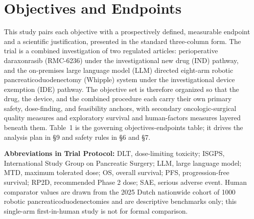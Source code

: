 \section{Objectives and Endpoints}

This study pairs each objective with a prospectively defined, measurable endpoint
and a scientific justification, presented in the standard three-column form. The
trial is a combined investigation of two regulated articles: perioperative
daraxonrasib (RMC-6236) under the investigational new drug (IND) pathway, and the
on-premises large language model (LLM) directed eight-arm robotic
pancreaticoduodenectomy (Whipple) system under the investigational device
exemption (IDE) pathway. The objective set is therefore organized so that the
drug, the device, and the combined procedure each carry their own primary
safety, dose-finding, and feasibility anchors, with secondary oncologic-surgical
quality measures and exploratory survival and human-factors measures layered
beneath them. Table~1 is the governing objectives-endpoints table; it drives the
analysis plan in \S9 and safety rules in \S6 and \S7.

\noindent \textbf{Abbreviations in Trial Protocol:} DLT, dose-limiting toxicity; ISGPS, International Study
Group on Pancreatic Surgery; LLM, large language model; MTD, maximum tolerated
dose; OS, overall survival; PFS, progression-free survival; RP2D, recommended
Phase 2 dose; SAE, serious adverse event. Human comparator values are drawn from
the 2025 Dutch nationwide cohort of 1000 robotic pancreaticoduodenectomies
\cite{DutchCohort2025} and are descriptive benchmarks only; this single-arm
first-in-human study is not for formal comparison.

\vspace{0.3em}




